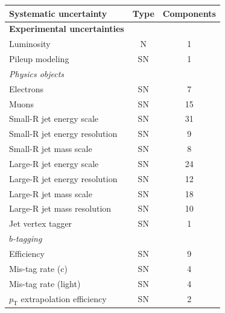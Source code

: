 \begin{longtable}[hp]{lcc}
    \hline\hline
    \textbf{Systematic uncertainty} & \textbf{Type} & \textbf{Components}\\
    \endfirsthead

    \endhead

    \endfoot
    \endlastfoot
    
    \hline
    \textbf{Experimental uncertainties} & &\\
    \hline
    \multicolumn{1}{l}{Luminosity}       &  N & 1\\
    \multicolumn{1}{l}{Pileup modeling} & SN & 1\\
    \hline
    \textit{Physics objects} & &\\
    \multicolumn{1}{l}{Electrons}                     & SN &  7\\
    \multicolumn{1}{l}{Muons}                         & SN & 15\\
    \multicolumn{1}{l}{Small-R jet energy scale}      & SN & 31\\
    \multicolumn{1}{l}{Small-R jet energy resolution} & SN &  9\\
    \multicolumn{1}{l}{Small-R jet mass scale}        & SN &  8\\
    \multicolumn{1}{l}{Large-R jet energy scale}      & SN & 24\\
    \multicolumn{1}{l}{Large-R jet energy resolution} & SN & 12\\
    \multicolumn{1}{l}{Large-R jet mass scale}        & SN & 18\\
    \multicolumn{1}{l}{Large-R jet mass resolution}   & SN & 10\\
    \multicolumn{1}{l}{Jet vertex tagger}             & SN &  1\\
    \hline
    \textit{$b$-tagging} & &\\
    \multicolumn{1}{l}{Efficiency}                            & SN &  9\\
    \multicolumn{1}{l}{Mis-tag rate (c)}                      & SN &  4\\
    \multicolumn{1}{l}{Mis-tag rate (light)}                  & SN &  4\\
    \multicolumn{1}{l}{$p_\text{T}$ extrapolation efficiency} & SN &  2\\

\end{longtable}
